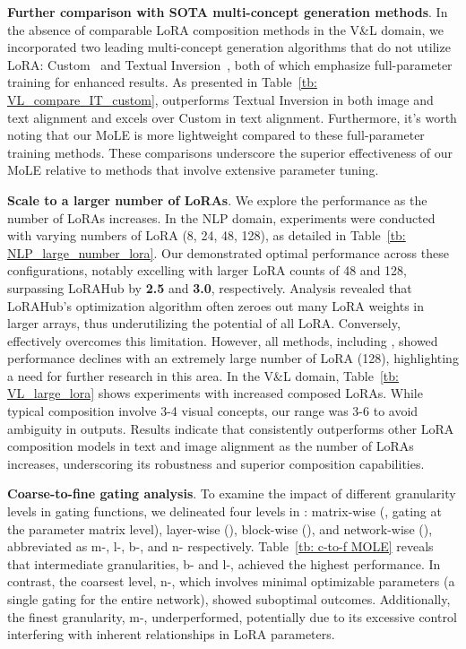 \noindent\textbf{Further comparison with SOTA multi-concept generation methods}. In the absence of comparable LoRA composition methods in the V\&L domain, we incorporated two leading multi-concept generation algorithms that do not utilize LoRA: Custom~\citep{kumari2023multi} and Textual Inversion~\citep{TI}, both of which emphasize full-parameter training for enhanced results.
As presented in Table~\ref{tb: VL_compare_IT_custom}, \our{} outperforms Textual Inversion in both image and text alignment and excels over Custom in text alignment. Furthermore, it's worth noting that our MoLE is more lightweight compared to these full-parameter training methods. These comparisons underscore the superior effectiveness of our MoLE relative to methods that involve extensive parameter tuning.

\noindent\textbf{Scale to a larger number of LoRAs}. We explore the performance as the number of LoRAs increases. 
In the NLP domain, experiments were conducted with varying numbers of LoRA (8, 24, 48, 128), as detailed in Table~\ref{tb: NLP_large_number_lora}. Our \our{} demonstrated optimal performance across these configurations, notably excelling with larger LoRA counts of 48 and 128, surpassing LoRAHub by \textbf{2.5} and \textbf{3.0}, respectively. Analysis revealed that LoRAHub's optimization algorithm often zeroes out many LoRA weights in larger arrays, thus underutilizing the potential of all LoRA. Conversely, \our{} effectively overcomes this limitation. However, all methods, including \our, showed performance declines with an extremely large number of LoRA (128), highlighting a need for further research in this area.
In the V\&L domain, Table~\ref{tb: VL_large_lora} shows experiments with increased composed LoRAs. While typical composition involve 3-4 visual concepts, our range was 3-6 to avoid ambiguity in outputs. Results indicate that \our{} consistently outperforms other LoRA composition models in text and image alignment as the number of LoRAs increases, underscoring its robustness and superior composition capabilities.

\noindent\textbf{Coarse-to-fine gating analysis}. To examine the impact of different granularity levels in gating functions, we delineated four levels in \our: matrix-wise (\our, gating at the parameter matrix level), layer-wise (\our), block-wise (\our), and network-wise (\our), abbreviated as m-\our, l-\our, b-\our, and n-\our{} respectively.
Table~\ref{tb: c-to-f MOLE} reveals that intermediate granularities, b-\our{} and l-\our, achieved the highest performance. In contrast, the coarsest level, n-\our, which involves minimal optimizable parameters (a single gating for the entire network), showed suboptimal outcomes.
Additionally, the finest granularity, m-\our, underperformed, potentially due to its excessive control interfering with inherent relationships in LoRA parameters.

